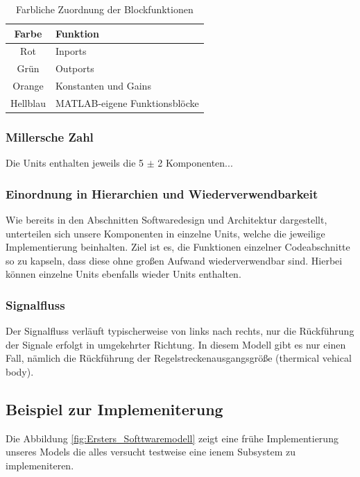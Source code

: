 \documentclass[a4paper,12pt]{article}
\begin{document}
	\begin{table}[h!]
		\centering
		\begin{tabular}{|c|l|}
			\hline
			\textbf{Farbe} & \textbf{Funktion} \\ \hline
			Rot & Inports \\ \hline
			Grün & Outports \\ \hline
			Orange & Konstanten und Gains \\ \hline
			Hellblau & MATLAB-eigene Funktionsblöcke \\ \hline
		\end{tabular}
		\caption{Farbliche Zuordnung der Blockfunktionen}
	\end{table}
	
	\subsubsection{Millersche Zahl}
	Die Units enthalten jeweils die 5 $\pm$ 2 Komponenten...
	
	\subsubsection{Einordnung in Hierarchien und Wiederverwendbarkeit}
	Wie bereits in den Abschnitten Softwaredesign und Architektur dargestellt, unterteilen sich unsere Komponenten in einzelne Units, welche die jeweilige Implementierung beinhalten. Ziel ist es, die Funktionen einzelner Codeabschnitte so zu kapseln, dass diese ohne gro\ss{}en Aufwand wiederverwendbar sind. Hierbei können einzelne Units ebenfalls wieder Units enthalten. 
	
	\subsubsection{Signalfluss}
	Der Signalfluss verläuft typischerweise von links nach rechts, nur die Rückführung der Signale erfolgt in umgekehrter Richtung. In diesem Modell gibt es nur einen Fall, nämlich die Rückführung der Regelstreckenausgangsgröße (thermical vehical body).
	
	\subsection{Beispiel zur Implemeniterung}
	Die Abbildung \ref{fig:Ersters_Softtwaremodell} zeigt eine frühe Implementierung unseres Models die alles versucht testweise eine ienem Subsystem zu implemeniteren. 
	
\end{document}
